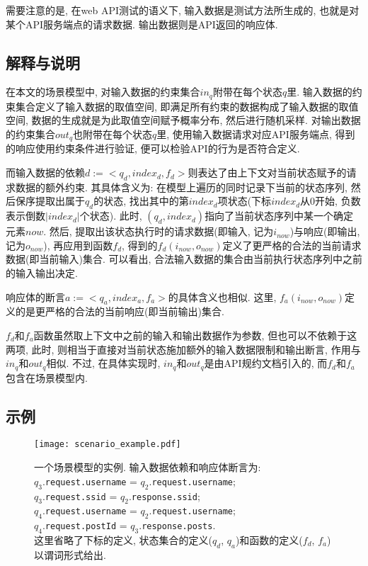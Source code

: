             需要注意的是, 在web API测试的语义下, 输入数据是测试方法所生成的, 也就是对某个API服务端点的请求数据. 输出数据则是API返回的响应体.
        
        \subsection{解释与说明}
            在本文的场景模型中, 对输入数据的约束集合$in_q$附带在每个状态$q$里. 输入数据的约束集合定义了输入数据的取值空间, 即满足所有约束的数据构成了输入数据的取值空间, 数据的生成就是为此取值空间赋予概率分布, 然后进行随机采样. 对输出数据的约束集合$out_q$也附带在每个状态$q$里, 使用输入数据请求对应API服务端点, 得到的响应使用约束条件进行验证, 便可以检验API的行为是否符合定义.
            
            而输入数据的依赖$d := <q_d, index_d, f_d >$则表达了由上下文对当前状态赋予的请求数据的额外约束. 其具体含义为: 在模型上遍历的同时记录下当前的状态序列, 然后保序提取出属于$q_d$的状态, 找出其中的第$index_d$项状态(下标$index_d$从0开始, 负数表示倒数$|index_d|$个状态). 此时, $(q_d, index_d)$指向了当前状态序列中某一个确定元素$now$. 然后, 提取出该状态执行时的请求数据(即输入, 记为$i_{now}$)与响应(即输出, 记为$o_{now}$), 再应用到函数$f_d$, 得到的$f_d(i_{now}, o_{now})$定义了更严格的合法的当前请求数据(即当前输入)集合. 可以看出, 合法输入数据的集合由当前执行状态序列中之前的输入输出决定.
            
            响应体的断言$a := <q_a, index_a, f_a>$的具体含义也相似. 这里, $f_a(i_{now}, o_{now})$定义的是更严格的合法的当前响应(即当前输出)集合.
            
            $f_d$和$f_a$函数虽然取上下文中之前的输入和输出数据作为参数, 但也可以不依赖于这两项, 此时, 则相当于直接对当前状态施加额外的输入数据限制和输出断言, 作用与$in_q$和$out_q$相似. 不过, 在具体实现时, $in_q$和$out_q$是由API规约文档引入的, 而$f_d$和$f_a$包含在场景模型内.
        
        \subsection{示例}
            \begin{figure}[!htb]
                \centering
                \texttt{[image: scenario\_example.pdf]}
                \caption{一个场景模型的实例. 输入数据依赖和响应体断言为: \\
                $q_3$.\texttt{request.username} = $q_2$.\texttt{request.username};\\
                $q_3$.\texttt{request.ssid} = $q_2$.\texttt{response.ssid};\\
                $q_4$.\texttt{request.username} = $q_2$.\texttt{request.username};\\
                $q_4$.\texttt{request.postId} = $q_3$.\texttt{response.posts}.\\
                这里省略了下标的定义, 状态集合的定义($q_d$, $q_a$)和函数的定义($f_d$, $f_a$)以谓词形式给出.}
                \label{fig:scenario_example}
            \end{figure}
            
